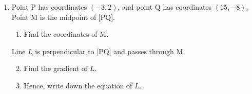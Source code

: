 \documentclass[12pt, twoside]{article}
\begin{document}
\begin{enumerate}
\item Point P has coordinates $(-3, 2)$, and point Q has coordinates $(15, -8)$. Point M is the midpoint of [PQ].
    \begin{enumerate}
        \item Find the coordinates of M.
    \end{enumerate}
    Line $L$ is perpendicular to [PQ] and passes through M.
    \begin{enumerate}
        \setcounter{enumii}{1}
        \item Find the gradient of $L$.
        \item Hence, write down the equation of $L$.
    \end{enumerate}
\end{enumerate}
\end{document}
